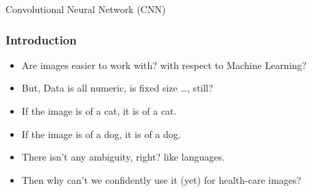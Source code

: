 \begin{frame}
  \begin{center}
    {\Large Convolutional Neural Network (CNN)}
  \end{center}
\end{frame}


\begin{frame}[fragile] \frametitle{Introduction}

\begin{itemize}
\item Are images easier to work with? with respect to Machine Learning?
\item But, Data is all numeric, is fixed size \ldots, still?
\item If the image is of a cat, it is of a cat.
\item If the image is of a dog, it is of a dog.
\item There isn't any ambiguity, right? like languages.
\item Then why can't we confidently use it (yet) for health-care images?
\end{itemize}


\end{frame}

% 
% 
% 
% 
% 

